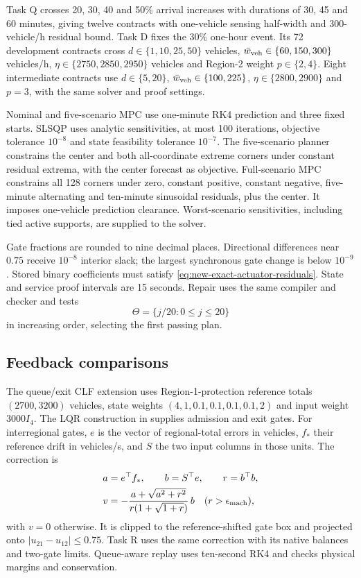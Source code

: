 Task Q crosses 20, 30, 40 and 50\% arrival increases with durations of
30, 45 and 60 minutes, giving twelve contracts with one-vehicle sensing
half-width and 300-vehicle/h residual bound. Task D fixes the 30\% one-hour
event. Its 72 development contracts cross $d\in\{1,10,25,50\}$ vehicles,
$\bar w_{\rm veh}\in\{60,150,300\}$ vehicles/h,
$\eta\in\{2750,2850,2950\}$ vehicles and Region-2 weight $p\in\{2,4\}$.
Eight intermediate contracts use $d\in\{5,20\}$,
$\bar w_{\rm veh}\in\{100,225\}$, $\eta\in\{2800,2900\}$ and $p=3$, with
the same solver and proof settings.

Nominal and five-scenario MPC use one-minute RK4 prediction and three
fixed starts. SLSQP uses analytic sensitivities, at most 100 iterations, objective
tolerance $10^{-8}$ and state feasibility tolerance $10^{-7}$. The
five-scenario planner constrains the center and both all-coordinate
extreme corners under constant residual extrema, with the center forecast
as objective. Full-scenario MPC constrains all 128 corners under zero,
constant positive, constant negative, five-minute alternating and
ten-minute sinusoidal residuals, plus the center. It imposes one-vehicle
prediction clearance. Worst-scenario sensitivities, including tied active
supports, are supplied to the solver.

Gate fractions are rounded to nine decimal places. Directional differences
near $0.75$ receive $10^{-8}$ interior slack; the largest synchronous
gate change is below $10^{-9}$. Stored binary coefficients must satisfy
\eqref{eq:new-exact-actuator-residuals}. State and service proof intervals
are 15 seconds. Repair uses the same compiler and checker and tests
\[
\Theta=\{j/20:0\le j\le20\}
\]
in increasing order, selecting the first passing plan.

\subsection{Feedback comparisons}
\label{app:benchmark-details}
The queue/exit CLF extension uses Region-1-protection reference totals
$(2700,3200)$ vehicles, state weights $(4,1,0.1,0.1,0.1,0.1,2)$ and input
weight $3000I_4$. The LQR construction in  supplies
admission and exit gates. For interregional gates, $e$ is the vector of
regional-total errors in vehicles, $f_*$ their reference drift in
vehicles/s, and $S$ the two input columns in those units. The correction is
\[
\begin{aligned}
a&=e^\top f_*,\qquad b=S^\top e,\qquad r=b^\top b,\\
v&=-\frac{a+\sqrt{a^2+r^2}}{r(1+\sqrt{1+r})}\,b
\quad(r>\epsilon_{\rm mach}),
\end{aligned}
\]
with $v=0$ otherwise. It is clipped to the reference-shifted gate box and
projected onto $|u_{21}-u_{12}|\le0.75$. Task R uses the same correction
with its native balances and two-gate limits. Queue-aware replay uses
ten-second RK4 and checks physical margins and conservation.

